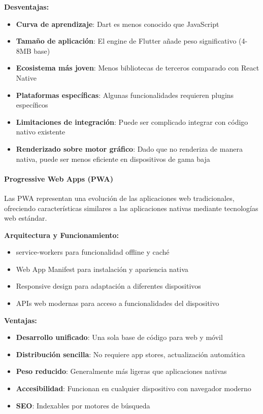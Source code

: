 \textbf{Desventajas:}
\begin{itemize}
    \item \textbf{Curva de aprendizaje}: Dart es menos conocido que JavaScript
    \item \textbf{Tamaño de aplicación}: El engine de Flutter añade peso significativo (4-8MB base)
    \item \textbf{Ecosistema más joven}: Menos bibliotecas de terceros comparado con React Native
    \item \textbf{Plataformas específicas}: Algunas funcionalidades requieren plugins específicos
    \item \textbf{Limitaciones de integración}: Puede ser complicado integrar con código nativo existente
    \item \textbf{Renderizado sobre motor gráfico}: Dado que no renderiza de manera nativa, puede ser menos eficiente en dispositivos de gama baja
\end{itemize}

\paragraph{Progressive Web Apps (PWA)}

Las PWA representan una evolución de las aplicaciones web tradicionales, ofreciendo características similares a las aplicaciones nativas mediante tecnologías web estándar.

\textbf{Arquitectura y Funcionamiento:}
\begin{itemize}
    \item \Glspl{service-worker} para funcionalidad offline y caché
    \item Web App Manifest para instalación y apariencia nativa
    \item Responsive design para adaptación a diferentes dispositivos
    \item APIs web modernas para acceso a funcionalidades del dispositivo
\end{itemize}

\textbf{Ventajas:}
\begin{itemize}
    \item \textbf{Desarrollo unificado}: Una sola base de código para web y móvil
    \item \textbf{Distribución sencilla}: No requiere app stores, actualización automática
    \item \textbf{Peso reducido}: Generalmente más ligeras que aplicaciones nativas
    \item \textbf{Accesibilidad}: Funcionan en cualquier dispositivo con navegador moderno
    \item \textbf{SEO}: Indexables por motores de búsqueda
\end{itemize}

